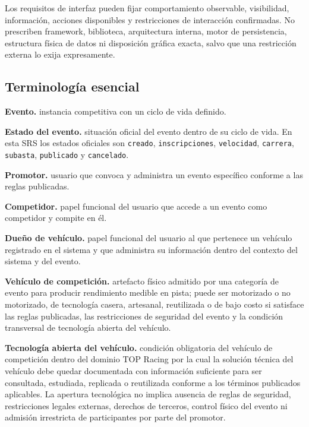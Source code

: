 \documentclass[10pt,letterpaper]{article}
\begin{document}
Los requisitos de interfaz pueden fijar comportamiento observable, visibilidad, información, acciones disponibles y restricciones de interacción confirmadas. No prescriben framework, biblioteca, arquitectura interna, motor de persistencia, estructura física de datos ni disposición gráfica exacta, salvo que una restricción externa lo exija expresamente.

\subsection{Terminología esencial}

\noindent\textbf{Evento.} instancia competitiva con un ciclo de vida definido.\par
\noindent\textbf{Estado del evento.} situación oficial del evento dentro de su ciclo de vida. En esta SRS los estados oficiales son \texttt{creado}, \texttt{inscripciones}, \texttt{velocidad}, \texttt{carrera}, \texttt{subasta}, \texttt{publicado} y \texttt{cancelado}.\par
\noindent\textbf{Promotor.} usuario que convoca y administra un evento específico conforme a las reglas publicadas.\par
\noindent\textbf{Competidor.} papel funcional del usuario que accede a un evento como competidor y compite en él.\par
\noindent\textbf{Dueño de vehículo.} papel funcional del usuario al que pertenece un vehículo registrado en el sistema y que administra su información dentro del contexto del sistema y del evento.\par
\noindent\textbf{Vehículo de competición.} artefacto físico admitido por una categoría de evento para producir rendimiento medible en pista; puede ser motorizado o no motorizado, de tecnología casera, artesanal, reutilizada o de bajo costo si satisface las reglas publicadas, las restricciones de seguridad del evento y la condición transversal de tecnología abierta del vehículo.\par
\noindent\textbf{Tecnología abierta del vehículo.} condición obligatoria del vehículo de competición dentro del dominio TOP Racing por la cual la solución técnica del vehículo debe quedar documentada con información suficiente para ser consultada, estudiada, replicada o reutilizada conforme a los términos publicados aplicables. La apertura tecnológica no implica ausencia de reglas de seguridad, restricciones legales externas, derechos de terceros, control físico del evento ni admisión irrestricta de participantes por parte del promotor.\par
\end{document}
